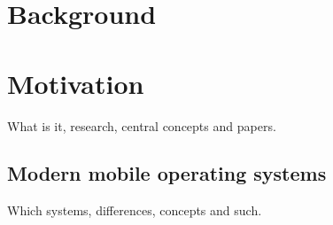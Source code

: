 \section{Background}
\label{background}

\section{Motivation}
\label{motivation}

What is it, research, central concepts and papers.

\subsection{Modern mobile operating systems}
\label{mobileOperatingSystems}

Which systems, differences, concepts and such.